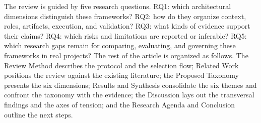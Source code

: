 The review is guided by five research questions. RQ1: which architectural dimensions distinguish these frameworks? RQ2: how do they organize context, roles, artifacts, execution, and validation? RQ3: what kinds of evidence support their claims? RQ4: which risks and limitations are reported or inferable? RQ5: which research gaps remain for comparing, evaluating, and governing these frameworks in real projects? The rest of the article is organized as follows. The Review Method describes the protocol and the selection flow; Related Work positions the review against the existing literature; the Proposed Taxonomy presents the six dimensions; Results and Synthesis consolidate the six themes and confront the taxonomy with the evidence; the Discussion lays out the transversal findings and the axes of tension; and the Research Agenda and Conclusion outline the next steps.
